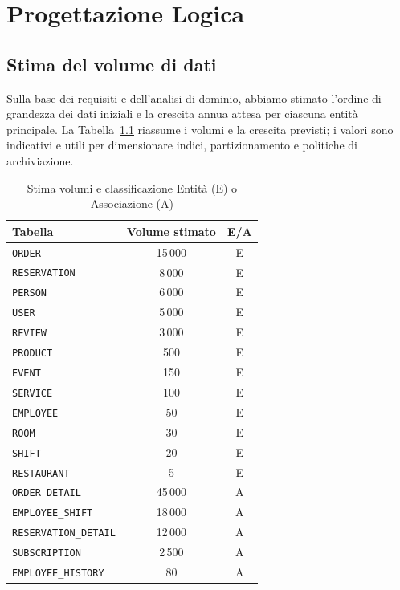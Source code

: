\documentclass[a4paper,12pt]{report}
\begin{document}
\newpage
\chapter{Progettazione Logica}

\section{Stima del volume di dati}
Sulla base dei requisiti e dell'analisi di dominio, abbiamo stimato
l'ordine di grandezza dei dati iniziali e la crescita annua attesa
per ciascuna entità principale. La Tabella~\ref{tab:volume-dati}
riassume i volumi e la crescita previsti; i valori sono indicativi e
utili per dimensionare indici, partizionamento e politiche di archiviazione.

\begin{table}[H]
  \centering
  \begin{tabularx}{\textwidth}{|X|c|c|}
    \hline
    \rowcolor{gray!15}
    \textbf{Tabella} & \textbf{Volume stimato} & \textbf{E/A} \\
    \hline
    \texttt{ORDER} & 15\,000 & E \\
    \texttt{RESERVATION} & 8\,000 & E \\
    \texttt{PERSON} & 6\,000 & E \\
    \texttt{USER} & 5\,000 & E \\
    \texttt{REVIEW} & 3\,000 & E \\
    \texttt{PRODUCT} & 500 & E \\
    \texttt{EVENT} & 150 & E \\
    \texttt{SERVICE} & 100 & E \\
    \texttt{EMPLOYEE} & 50 & E \\
    \texttt{ROOM} & 30 & E \\
    \texttt{SHIFT} & 20 & E \\
    \texttt{RESTAURANT} & 5 & E \\
    \texttt{ORDER\_DETAIL} & 45\,000  & A \\
    \texttt{EMPLOYEE\_SHIFT} & 18\,000 & A \\
    \texttt{RESERVATION\_DETAIL} & 12\,000 & A \\
    \texttt{SUBSCRIPTION} & 2\,500 & A \\
    \texttt{EMPLOYEE\_HISTORY} & 80 & A \\
    \hline
  \end{tabularx}

  \caption{Stima volumi e classificazione Entità (E) o Associazione (A)}
  \label{tab:volume-dati}
\end{table}
\end{document}
